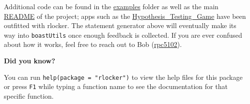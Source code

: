 \documentclass[
]{book}
\newenvironment{Shaded}{\begin{snugshade}}{\end{snugshade}}
\newcommand{\CommentTok}[1]{\textcolor[rgb]{0.56,0.35,0.01}{\textit{#1}}}
\newcommand{\DataTypeTok}[1]{\textcolor[rgb]{0.13,0.29,0.53}{#1}}
\newcommand{\KeywordTok}[1]{\textcolor[rgb]{0.13,0.29,0.53}{\textbf{#1}}}
\newcommand{\NormalTok}[1]{#1}
\newcommand{\OperatorTok}[1]{\textcolor[rgb]{0.81,0.36,0.00}{\textbf{#1}}}
\newcommand{\OtherTok}[1]{\textcolor[rgb]{0.56,0.35,0.01}{#1}}
\newcommand{\StringTok}[1]{\textcolor[rgb]{0.31,0.60,0.02}{#1}}
\begin{document}
\begin{Shaded}
\end{Shaded}

Additional code can be found in the \href{https://github.com/rpc5102/rlocker/tree/master/inst/examples}{examples} folder as well as the main \href{https://github.com/rpc5102/rlocker/blob/master/README.md}{README} of the project; apps such as the \href{https://github.com/EducationShinyAppTeam/Hypothesis_Testing_Game}{Hypothesis\_Testing\_Game} have been outfitted with rlocker. The statement generator above will eventually make its way into \texttt{boastUtils} once enough feedback is collected. If you are ever confused about how it works, feel free to reach out to Bob (\href{mailto:rpc5102@psu.edu}{rpc5102}).

\textbf{Did you know?}

You can run \texttt{help(package\ =\ "rlocker")} to view the help files for this package or press \texttt{F1} while typing a function name to see the documentation for that specific function.
\end{document}
